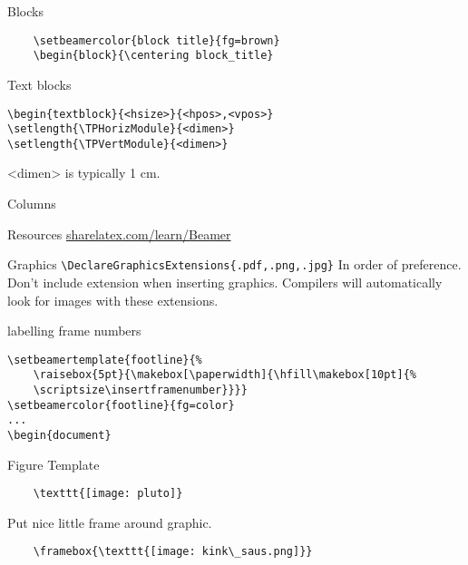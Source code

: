 \documentclass[9pt]{beamer}
\begin{document}
\begin{frame}[fragile=singleslide]{Blocks}
    \begin{verbatim}
    \setbeamercolor{block title}{fg=brown}
    \begin{block}{\centering block_title}
    \end{verbatim}

\end{frame}%
\begin{frame}[fragile=singleslide]{Text blocks}
\begin{verbatim}
\begin{textblock}{<hsize>}{<hpos>,<vpos>}
\setlength{\TPHorizModule}{<dimen>}
\setlength{\TPVertModule}{<dimen>}
\end{verbatim}
<dimen> is typically 1 cm.
\end{frame}%
\begin{frame}[fragile=singleslide]{Columns}
\end{frame}%
\begin{frame}[fragile=singleslide]{Resources}
    \url{sharelatex.com/learn/Beamer}
\end{frame}%
\begin{frame}[fragile=singleslide]{Graphics}
    \verb|\DeclareGraphicsExtensions{.pdf,.png,.jpg}|
    In order of preference. Don't include extension when inserting
    graphics. Compilers will automatically look for images with these
    extensions.
\end{frame}%
\begin{frame}[fragile=singleslide]{labelling frame numbers}
    \begin{verbatim}
\setbeamertemplate{footline}{%
    \raisebox{5pt}{\makebox[\paperwidth]{\hfill\makebox[10pt]{%
    \scriptsize\insertframenumber}}}}
\setbeamercolor{footline}{fg=color}
...
\begin{document}
    \end{verbatim}
\end{frame}%
\begin{frame}[fragile=singleslide]{Figure Template}
    \begin{verbatim}
    \texttt{[image: pluto]}
    \end{verbatim}
    Put nice little frame around graphic.
    \begin{verbatim}
    \framebox{\texttt{[image: kink\_saus.png]}}
    \end{verbatim}
\end{frame}%
\end{document}
